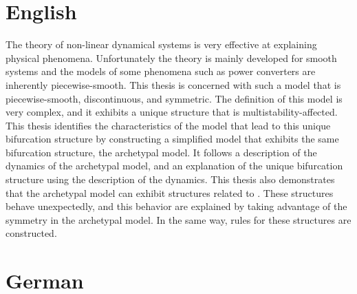 \section{English}

The theory of non-linear dynamical systems is very effective at explaining physical phenomena.
Unfortunately the theory is mainly developed for smooth systems and the models of some phenomena such as power converters are inherently piecewise-smooth.
This thesis is concerned with such a model that is piecewise-smooth, discontinuous, and symmetric.
The definition of this model is very complex, and it exhibits a unique  structure that is multistability-affected.
This thesis identifies the characteristics of the model that lead to this unique bifurcation structure by constructing a simplified model that exhibits the same bifurcation structure, the archetypal model.
It follows a description of the dynamics of the archetypal model, and an explanation of the unique bifurcation structure using the description of the dynamics.
This thesis also demonstrates that the archetypal model can exhibit structures related to .
These structures behave unexpectedly, and this behavior are explained by taking advantage of the symmetry in the archetypal model.
In the same way, rules for these  structures are constructed.


\section{German}

